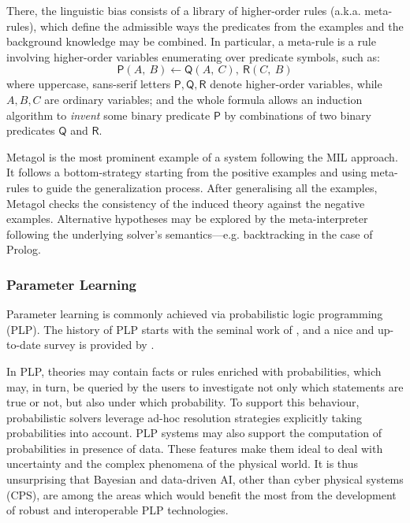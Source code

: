 \documentclass[12pt,a4paper,openright,twoside]{book}
\begin{document}
There, the linguistic bias consists of a library of higher-order rules (a.k.a. meta-rules), which define the admissible ways the predicates from the examples and the background knowledge may be combined.
%
In particular, a meta-rule is a rule involving higher-order variables enumerating over predicate symbols, such as:
%
\begin{equation}\label{eq:meta-rule-example}
    \textsf{P}(A,\ B) \leftarrow \textsf{Q}(A,\ C),\ \textsf{R}(C,\ B)
\end{equation}
%
where uppercase, sans-serif letters $\textsf{P}, \textsf{Q}, \textsf{R}$ denote higher-order variables, while $A, B, C$ are ordinary variables; and the whole formula allows an induction algorithm to \emph{invent} \cite{MuggletonB88} some binary predicate $\textsf{P}$ by combinations of two binary predicates $\textsf{Q}$ and $\textsf{R}$.

Metagol \cite{MuggletonLT15} is the most prominent example of a system following the MIL approach.
%
It follows a bottom-strategy starting from the positive examples and using meta-rules to guide the generalization process.
%
After generalising all the examples, Metagol checks the consistency of the induced theory against the negative examples.
%
Alternative hypotheses may be explored by the meta-interpreter following the underlying solver's semantics---e.g. backtracking in the case of Prolog.

\subsubsection{Parameter Learning}
\label{ssec:parameter-learning}

Parameter learning is commonly achieved via probabilistic logic programming (PLP).
%
The history of PLP starts with the seminal work of \cite{ng1992probabilistic}, and a nice and up-to-date survey is provided by \cite{riguzzi2018}.

In PLP, theories may contain facts or rules enriched with probabilities, which may, in turn, be queried by the users to investigate not only which statements are true or not, but also under which probability.
%
To support this behaviour, probabilistic solvers leverage ad-hoc resolution strategies explicitly taking probabilities into account.
%
PLP systems may also support the computation of probabilities in presence of data.
%
These features make them ideal to deal with uncertainty and the complex phenomena of the physical world.
%
It is thus unsurprising that Bayesian and data-driven AI, other than cyber physical systems (CPS), are among the areas which would benefit the most from the development of robust and interoperable PLP technologies.
\end{document}
